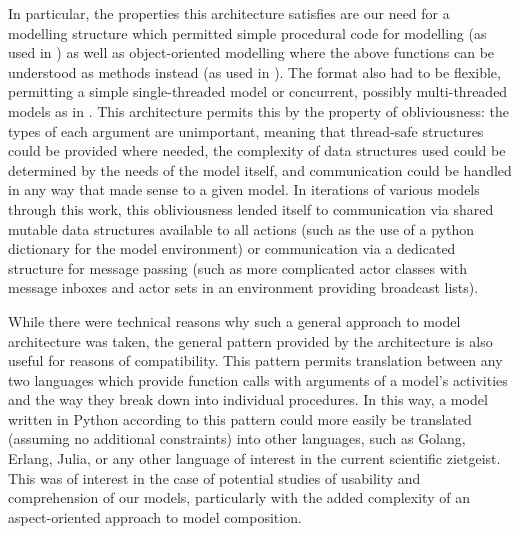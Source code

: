 In particular, the properties this architecture satisfies are our need for a
modelling structure which permitted simple procedural code for modelling (as
used in \cite{pycx}) as well as object-oriented modelling where the above
functions can be understood as methods instead (as used in
\cite{wallis2018caise}). The format also had to be flexible, permitting a simple
single-threaded model or concurrent, possibly multi-threaded models as in
\cite{theatre_codebase}. This
architecture permits this by the property of obliviousness: the types of each
argument are unimportant, meaning that thread-safe structures could be provided
where needed, the complexity of data structures used could be determined by the
needs of the model itself, and communication could be handled in any way that
made sense to a given model. In iterations of various models through this work,
this obliviousness lended itself to communication via  shared mutable data structures
available to all actions (such as the use of a python dictionary for the model
environment) or communication via a dedicated structure for message passing
(such as more complicated actor classes with message inboxes and actor sets in an
environment providing broadcast lists).

While there were technical reasons why such a general approach to model
architecture was taken, the general pattern provided by the architecture is also
useful for reasons of compatibility. This pattern permits translation between
any two languages which provide function calls with arguments of a model's
activities and the way they break down into individual procedures. In this way,
a model written in Python according to this pattern could more easily be
translated (assuming no additional constraints) into other languages, such as
Golang, Erlang, Julia, or any other language of interest in the current
scientific zietgeist. This was of interest in the case of potential studies of
usability and comprehension of our models, particularly with the added
complexity of an aspect-oriented approach to model composition.


